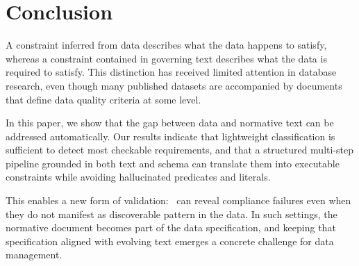 \section{Conclusion}
\label{sec:conclusion}

A constraint inferred from data describes what the data happens to satisfy, whereas a constraint contained in governing text describes what the data is required to satisfy. This distinction  has received limited attention in database research, even though many published datasets are accompanied by documents that define data quality criteria at some level. 

In this paper, we show that the gap between data and normative text can be addressed automatically. Our results indicate that lightweight classification is sufficient to detect  most checkable requirements, and that a structured multi-step pipeline grounded in both text and schema can translate them into executable constraints while avoiding hallucinated predicates and literals. 

This enables a new form of validation: \system\ can reveal compliance failures even when they do not manifest as discoverable pattern in the data. In such settings, the normative document becomes  part of the data specification, and keeping that specification aligned with evolving text emerges a concrete challenge for data management.
